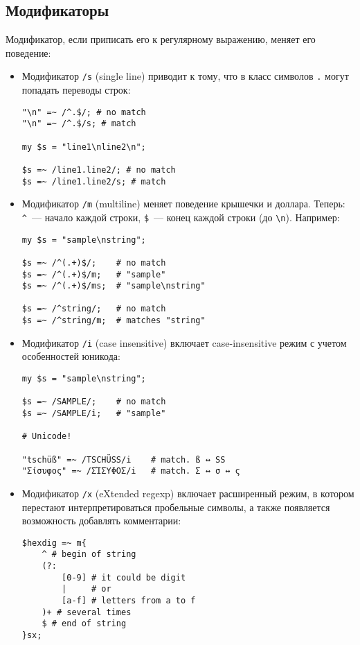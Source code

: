 \subsection{Модификаторы} %
Модификатор, если приписать его к регулярному выражению, меняет его поведение:
\begin{itemize}
  \item Модификатор \verb|/s| (single line) приводит к тому, что в класс символов \verb|.| могут попадать переводы строк:
\begin{verbatim}
"\n" =~ /^.$/; # no match
"\n" =~ /^.$/s; # match

my $s = "line1\nline2\n";

$s =~ /line1.line2/; # no match
$s =~ /line1.line2/s; # match
\end{verbatim}
  \item Модификатор \verb|/m| (multiline) меняет поведение крышечки и доллара. Теперь: \verb|^|~--- начало каждой строки,  \verb|$|~--- конец каждой строки (до \verb|\n|). Например:
\begin{verbatim}
my $s = "sample\nstring";

$s =~ /^(.+)$/;    # no match
$s =~ /^(.+)$/m;   # "sample"
$s =~ /^(.+)$/ms;  # "sample\nstring"

$s =~ /^string/;   # no match
$s =~ /^string/m;  # matches "string"
\end{verbatim}
  \item Модификатор \verb|/i| (case insensitive) включает case-insensitive режим с учетом особенностей юникода:
\begin{verbatim}
my $s = "sample\nstring";

$s =~ /SAMPLE/;    # no match
$s =~ /SAMPLE/i;   # "sample"

# Unicode!

"tschüß" =~ /TSCHÜSS/i    # match. ß ↔ SS
"Σίσυφος" =~ /ΣΊΣΥΦΟΣ/i   # match. Σ ↔ σ ↔ ς
\end{verbatim}

\item Модификатор \verb|/x| (eXtended regexp) включает расширенный режим, в котором перестают интерпретироваться пробельные символы, а также появляется возможность добавлять комментарии:
\begin{verbatim}
$hexdig =~ m{
    ^ # begin of string
    (?:
        [0-9] # it could be digit
        |     # or
        [a-f] # letters from a to f
    )+ # several times
    $ # end of string
}sx;
\end{verbatim}


\end{itemize}
